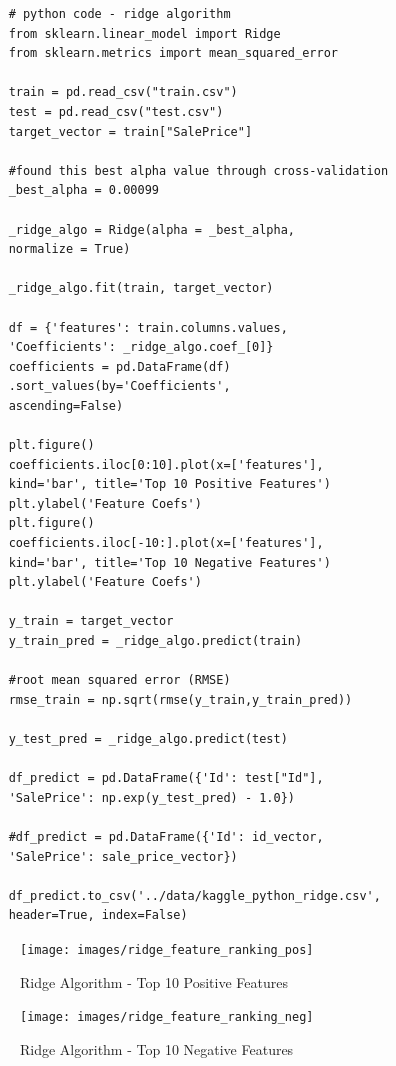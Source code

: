 \documentclass[sigconf]{acmart}
\begin{document}
	\begin{verbatim}
	# python code - ridge algorithm
	from sklearn.linear_model import Ridge
	from sklearn.metrics import mean_squared_error
	
	train = pd.read_csv("train.csv")
	test = pd.read_csv("test.csv")
	target_vector = train["SalePrice"]
	
	#found this best alpha value through cross-validation
	_best_alpha = 0.00099
	
	_ridge_algo = Ridge(alpha = _best_alpha, 
	normalize = True)		
	
	_ridge_algo.fit(train, target_vector)   
	
	df = {'features': train.columns.values, 
	'Coefficients': _ridge_algo.coef_[0]}	          
	coefficients = pd.DataFrame(df)
	.sort_values(by='Coefficients', 
	ascending=False)
	
	plt.figure()
	coefficients.iloc[0:10].plot(x=['features'], 
	kind='bar', title='Top 10 Positive Features')	                 
	plt.ylabel('Feature Coefs')	
	plt.figure()
	coefficients.iloc[-10:].plot(x=['features'], 
	kind='bar', title='Top 10 Negative Features')
	plt.ylabel('Feature Coefs')
	
	y_train = target_vector
	y_train_pred = _ridge_algo.predict(train)
	
	#root mean squared error (RMSE)
	rmse_train = np.sqrt(rmse(y_train,y_train_pred))	
	
	y_test_pred = _ridge_algo.predict(test)
	
	df_predict = pd.DataFrame({'Id': test["Id"], 
	'SalePrice': np.exp(y_test_pred) - 1.0})
	
	#df_predict = pd.DataFrame({'Id': id_vector, 
	'SalePrice': sale_price_vector})
	
	df_predict.to_csv('../data/kaggle_python_ridge.csv',
	header=True, index=False)	
	\end{verbatim}
	
	\begin{figure}[H]
		\centering
		\texttt{[image: images/ridge\_feature\_ranking\_pos]}	
		\caption{Ridge Algorithm - Top 10 Positive Features} \label{fig:ridge_feature_ranking_pos} 
	\end{figure}
	
	\begin{figure}[H]
		\centering
		\texttt{[image: images/ridge\_feature\_ranking\_neg]}	
		\caption{Ridge Algorithm - Top 10 Negative Features} \label{fig:ridge_feature_ranking_neg} 
	\end{figure}
	
\end{document}
